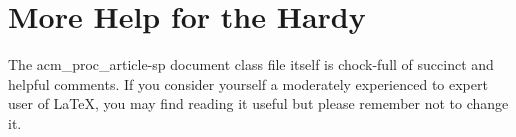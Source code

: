 \documentclass{acm_proc_article-sp}
\begin{document}
\section{More Help for the Hardy}
The acm\_proc\_article-sp document class file itself is chock-full of succinct
and helpful comments.  If you consider yourself a moderately
experienced to expert user of \LaTeX, you may find reading
it useful but please remember not to change it.
\balancecolumns
\end{document}
